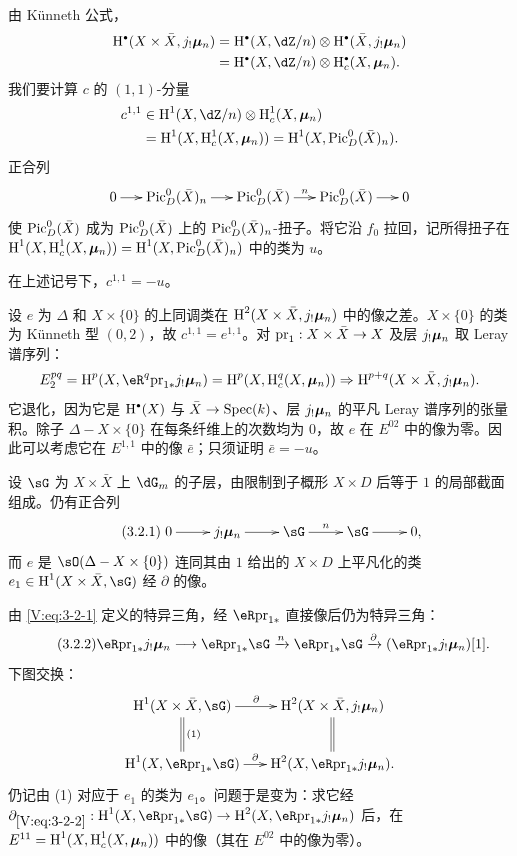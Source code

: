 由 Künneth 公式，
\[
\begin{aligned}
\h^\bullet(X\times\bar X,j_!\dmu_n)
&=\h^\bullet(X,\dZ/n)\otimes\h^\bullet(\bar X,j_!\dmu_n)\\
&=\h^\bullet(X,\dZ/n)\otimes\h_c^\bullet(X,\dmu_n).
\end{aligned}
\]
我们要计算 $c$ 的 $(1,1)$-分量
\[
\begin{aligned}
c^{1,1}&\in\h^1(X,\dZ/n)\otimes\h_c^1(X,\dmu_n)\\
&=\h^1(X,\h_c^1(X,\dmu_n))=\h^1(X,\pic_D^0(\bar X)_n).
\end{aligned}
\]
正合列
\[\xymatrix@C=15pt{0\ar[r]&\pic_D^0(\bar X)_n\ar[r]&\pic_D^0(\bar X)\ar[r]^-n&\pic_D^0(\bar X)\ar[r]&0}\]
使 $\operatorname{Pic}_D^0(\bar X)$ 成为 $\operatorname{Pic}_D^0(\bar X)$ 上的 $\operatorname{Pic}_D^0(\bar X)_n$-扭子。将它沿 $f_0$ 拉回，记所得扭子在
$\operatorname{H}^1(X,\operatorname{H}_c^1(X,{\bm\mu}_n))=\operatorname{H}^1(X,\operatorname{Pic}_D^0(\bar X)_n)$ 中的类为 $u$。

\begin{proposition_}\label{V:3-2}
在上述记号下，$c^{1,1}=-u$。
\end{proposition_}
设 $e$ 为 $\Delta$ 和 $X\times\{0\}$ 的上同调类在 $\operatorname{H}^2(X\times\bar X,j_!{\bm\mu}_n)$ 中的像之差。$X\times\{0\}$ 的类为 Künneth 型 $(0,2)$，故 $c^{1,1}=e^{1,1}$。对 $\mathrm{pr}_1:X\times\bar X\to X$ 及层 $j_!{\bm\mu}_n$ 取 Leray 谱序列：
\[
E_2^{pq}=\h^p(X,\eR^q\pr_{1*}j_!\dmu_n)
=\h^p(X,\h_c^q(X,\dmu_n))
\Rightarrow\h^{p+q}(X\times\bar X,j_!\dmu_n).
\]
它退化，因为它是 $\h^\bullet(X)$ 与 $\bar X\to\operatorname{Spec}(k)$、层 $j_!{\bm\mu}_n$ 的平凡 Leray 谱序列的张量积。除子 $\Delta-X\times\{0\}$ 在每条纤维上的次数均为 $0$，故 $e$ 在 $E^{02}$ 中的像为零。因此可以考虑它在 $E^{1,1}$ 中的像 $\bar e$；只须证明 $\bar e=-u$。

设 $\sG$ 为 $X\times\bar X$ 上 $\dG_m$ 的子层，由限制到子概形 $X\times D$ 后等于 $1$ 的局部截面组成。仍有正合列
\begin{equation*}\tag{3.2.1}\label{V:eq:3-2-1}
\xymatrix{0\ar[r]&j_!\dmu_n\ar[r]&\sG\ar[r]^-n&\sG\ar[r]&0,}
\end{equation*}
而 $e$ 是 $\sO(\Delta-X\times\{0\})$ 连同其由 $1$ 给出的 $X\times D$ 上平凡化的类
$e_1\in\h^1(X\times\bar X,\sG)$ 经 $\partial$ 的像。

由 \eqref{V:eq:3-2-1} 定义的特异三角，经 $\eR\pr_{1*}$ 直接像后仍为特异三角：
\begin{equation*}\tag{3.2.2}\label{V:eq:3-2-2}
\eR\pr_{1*}j_!\dmu_n\longrightarrow\eR\pr_{1*}\sG
\xrightarrow{n}\eR\pr_{1*}\sG
\xrightarrow{\partial}(\eR\pr_{1*}j_!\dmu_n)[1].
\end{equation*}
下图交换：
\[\xymatrix@C=16pt{
\h^1(X\times\bar X,\sG)\ar[r]^-\partial\ar@{=}[d]^-{(1)}&\h^2(X\times\bar X,j_!\dmu_n)\ar@{=}[d]\\
\h^1(X,\eR\pr_{1*}\sG)\ar[r]^-\partial&\h^2(X,\eR\pr_{1*}j_!\dmu_n).
}\]
仍记由 (1) 对应于 $e_1$ 的类为 $e_1$。问题于是变为：求它经
$\partial_{\eqref{V:eq:3-2-2}}:\h^1(X,\eR\pr_{1*}\sG)\to\h^2(X,\eR\pr_{1*}j_!\dmu_n)$ 后，在 $E^{11}=\operatorname{H}^1(X,\operatorname{H}_c^1(X,{\bm\mu}_n))$ 中的像（其在 $E^{02}$ 中的像为零）。

